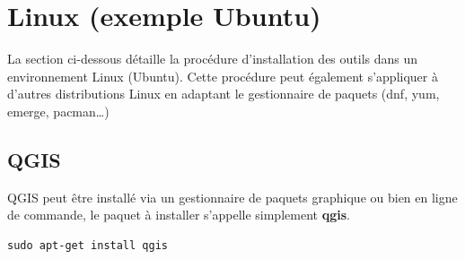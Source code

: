 \documentclass[10pt,a4paper]{article}
\begin{document}

\clearpage
\section{Linux (exemple Ubuntu)}

La section ci-dessous détaille la procédure d'installation des outils dans un
environnement Linux (Ubuntu). Cette procédure peut également s'appliquer à
d'autres distributions Linux en adaptant le gestionnaire de paquets (dnf, yum,
emerge, pacman\ldots)

\subsection{QGIS}
QGIS peut être installé via un gestionnaire de paquets graphique ou bien en
ligne de commande, le paquet à installer s'appelle simplement \textbf{qgis}.
\begin{verbatim}
sudo apt-get install qgis
\end{verbatim}
\end{document}
